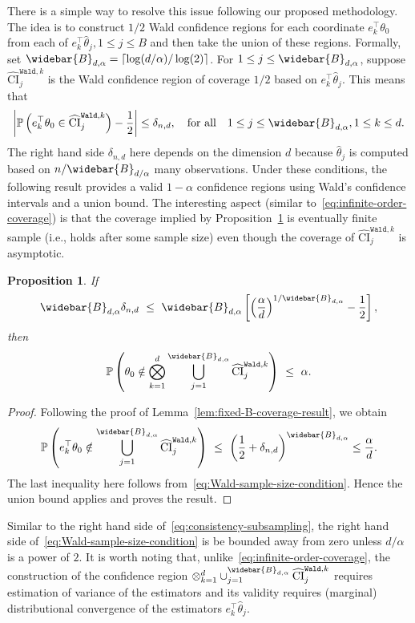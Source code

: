 \documentclass{article}
\newtheorem{prop}{Proposition}
\numberwithin{myalgctr}{section}
\begin{document}
There is a simple way to resolve this issue following our proposed methodology. The idea is to construct $1/2$ Wald confidence regions for each coordinate $e_k^{\top}\theta_0$ from each of $e_k^{\top}\widehat{\theta}_j, 1\le j\le B$ and then take the union of these regions. Formally, set $\widebar{B}_{d,\alpha} = \lceil\log(d/\alpha)/\log(2)\rceil$. For $1\le j\le \widebar{B}_{d,\alpha}$, suppose $\widehat{\mathrm{CI}}_{j}^{\texttt{Wald}, k}$ is the Wald confidence region of coverage $1/2$ based on $e_k^{\top}\widehat{\theta}_j$. This means that
\[
\left|\mathbb{P}\left(e_k^{\top}\theta_0 \in \widehat{\mathrm{CI}}_{j}^{\texttt{Wald}, k}\right) - \frac{1}{2}\right| \le \delta_{n,d},\quad\mbox{for all}\quad 1\le j\le \widebar{B}_{d,\alpha}, 1\le k\le d.
\]
The right hand side $\delta_{n,d}$ here depends on the dimension $d$ because $\widehat{\theta}_j$ is computed based on $n/\widebar{B}_{d/\alpha}$ many observations. 
Under these conditions, the following result provides a valid $1 - \alpha$ confidence regions using Wald's confidence intervals and a union bound. The interesting aspect (similar to~\eqref{eq:infinite-order-coverage}) is that the coverage implied by Proposition~\ref{prop:Wald-union-bound} is eventually finite sample (i.e., holds after some sample size) even though the coverage of $\widehat{\mathrm{CI}}_j^{\texttt{Wald}, k}$ is asymptotic.
\begin{prop}\label{prop:Wald-union-bound}
If
\begin{equation}\label{eq:Wald-sample-size-condition}
\widebar{B}_{d,\alpha}\delta_{n,d} ~\le~ \widebar{B}_{d,\alpha}\left[\left(\frac{\alpha}{d}\right)^{1/\widebar{B}_{d,\alpha}} - \frac{1}{2}\right],
\end{equation}
then
\[
\mathbb{P}\left(\theta_0 \notin \bigotimes_{k=1}^d\bigcup_{j=1}^{\widebar{B}_{d,\alpha}}\widehat{\mathrm{CI}}_{j}^{\texttt{Wald}, k}\right) ~\le~ \alpha.
\]
\end{prop}
\begin{proof}%
Following the proof of Lemma~\ref{lem:fixed-B-coverage-result}, we obtain
\[
\mathbb{P}\left(e_k^{\top}\theta_0 \notin \bigcup_{j=1}^{\widebar{B}_{d,\alpha}} \widehat{\mathrm{CI}}_{j}^{\texttt{Wald}, k}\right) ~\le~ \left(\frac{1}{2} + \delta_{n,d}\right)^{\widebar{B}_{d,\alpha}} \le \frac{\alpha}{d}.
\]
The last inequality here follows from~\eqref{eq:Wald-sample-size-condition}. Hence the union bound applies and proves the result.
\end{proof}
Similar to the right hand side of~\eqref{eq:consistency-subsampling}, the right hand side of~\eqref{eq:Wald-sample-size-condition} is be bounded away from zero unless $d/\alpha$ is a power of $2$. It is worth noting that, unlike~\eqref{eq:infinite-order-coverage}, the construction of the confidence region $\otimes_{k=1}^d\cup_{j=1}^{\widebar{B}_{d,\alpha}}\widehat{\mathrm{CI}}_{j}^{\texttt{Wald}, k}$ requires estimation of variance of the estimators and its validity requires (marginal) distributional convergence of the estimators $e_k^{\top}\widehat{\theta}_j$.
\end{document}
